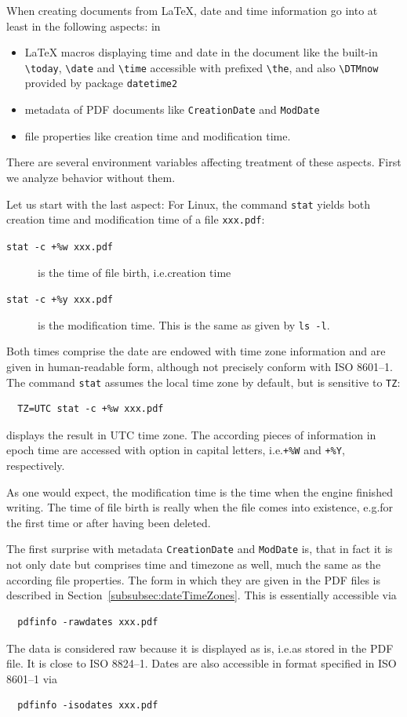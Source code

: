 \documentclass[a4paper]{article}%
\newcommand{\cmd}[1]{\texttt{\textbackslash#1}}
\begin{document}
When creating documents from \LaTeX, 
date and time information go into at least in the following aspects: in 
%
\begin{itemize}
\item 
\LaTeX{} macros displaying time and date in the document 
like the built-in \cmd{today}, \cmd{date} and \cmd{time} 
accessible with prefixed \cmd{the}, 
and also \cmd{DTMnow} provided by package \texttt{datetime2} 
\item 
metadata of PDF documents like \texttt{CreationDate} 
and \texttt{ModDate}
\item 
file properties like creation time and modification time. 
\end{itemize}

There are several environment variables affecting treatment of these aspects. 
First we analyze behavior without them. 

Let us start with the last aspect: 
For Linux, the command \texttt{stat} 
yields both creation time and modification time of a file \texttt{xxx.pdf}: 
%
\begin{description}
  \item[\texttt{stat -c +\%w xxx.pdf}] is the time of file birth, i.e.\@ creation time 
  \item[\texttt{stat -c +\%y xxx.pdf}] is the modification time. 
  This is the same as given by \texttt{ls -l}. 
\end{description}
%
Both times comprise the date 
are endowed with time zone information and are given in human-readable form, 
although not precisely conform with ISO 8601--1. 
The command \texttt{stat} assumes the local time zone by default, 
but is sensitive to \texttt{TZ}: 
%
\begin{verbatim}
  TZ=UTC stat -c +%w xxx.pdf
\end{verbatim}
%
displays the result in UTC time zone. 
The according pieces of information in epoch time 
are accessed with option in capital letters, 
i.e.\@ \texttt{+\%W} and \texttt{+\%Y}, respectively. 
\medskip


As one would expect, the modification time is the time when the engine finished writing. 
The time of file birth is really when the file comes into existence, 
e.g.\@ for the first time or after having been deleted. 

The first surprise with metadata \texttt{CreationDate} and \texttt{ModDate} is, 
that in fact it is not only date but comprises time and timezone as well, 
much the same as the according file properties. 
The form in which they are given in the PDF files 
is described in Section~\ref{subsubsec:dateTimeZones}. 
This is essentially accessible via 
%
\begin{verbatim}
  pdfinfo -rawdates xxx.pdf
\end{verbatim}
%
The data is considered raw because it is displayed as is, i.e.\@ as stored in the PDF file. 
It is close to ISO 8824--1. 
Dates are also accessible in format specified in ISO 8601--1 via 
%
\begin{verbatim}
  pdfinfo -isodates xxx.pdf
\end{verbatim}
\end{document}
